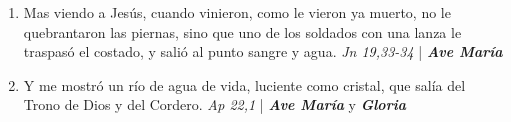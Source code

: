 \documentclass[../../devocionario.tex]{subfiles}
\begin{document}
\begin{enumerate}
        \item Mas viendo a Jesús, cuando vinieron, como le vieron ya muerto, no le quebrantaron las piernas, 
            sino que uno de los soldados con una lanza le traspasó el costado, y salió al punto sangre y agua. \textit{Jn 19,33-34} | \textbf{\textit{Ave María}}

        \item Y me mostró un río de agua de vida, luciente como cristal, que salía del Trono de Dios y del Cordero. \textit{Ap 22,1} | \textbf{\textit{Ave María}} y \textbf{\textit{Gloria}}

    \end{enumerate}
\end{document}
